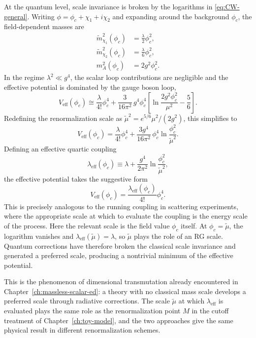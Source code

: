 At the quantum level, scale invariance is broken by the logarithms in
\eqref{eq:CW-general}. Writing $\phi = \phi_c + \chi_1 + i\chi_2$ and
expanding around the background $\phi_c$, the field-dependent masses are
\begin{align}
	\tilde m_{\chi_1}^2(\phi_c) & = \frac{\lambda}{2}\phi_c^2, \\
	\tilde m_{\chi_2}^2(\phi_c) & = \frac{\lambda}{6}\phi_c^2, \\
	m_A^2(\phi_c)               & = 2g^2\phi_c^2.
\end{align}
In the regime $\lambda^2\ll g^4$, the scalar loop contributions are
negligible and the effective potential is dominated by the gauge boson
loop,
\begin{equation}
	V_{\text{eff}}(\phi_c) \cong \frac{\lambda}{4!}\phi_c^4
	+ \frac{3}{16\pi^2}\,g^4\phi_c^4
	\left[\ln\frac{2g^2\phi_c^2}{\mu^2} - \frac{5}{6}\right].
\end{equation}
Redefining the renormalization scale as $\tilde\mu^2 =
	e^{5/6}\mu^2/(2g^2)$, this simplifies to
\begin{equation}
	V_{\text{eff}}(\phi_c) = \frac{\lambda}{4!}\phi_c^4
	+ \frac{3g^4}{16\pi^2}\,\phi_c^4
	\ln\frac{\phi_c^2}{\tilde\mu^2}.
\end{equation}
Defining an effective quartic coupling
\begin{equation}
	\lambda_{\text{eff}}(\phi_c) \equiv \lambda
	+ \frac{g^4}{2\pi^2}\ln\frac{\phi_c^2}{\tilde\mu^2},
\end{equation}
the effective potential takes the suggestive form
\begin{equation}
	V_{\text{eff}}(\phi_c) = \frac{\lambda_{\text{eff}}(\phi_c)}{4!}
	\phi_c^4.
\end{equation}
This is precisely analogous to the running coupling in scattering
experiments, where the appropriate scale at which to evaluate the
coupling is the energy scale of the process. Here the relevant scale is
the field value $\phi_c$ itself. At $\phi_c = \tilde\mu$, the logarithm
vanishes and $\lambda_{\text{eff}}(\tilde\mu) = \lambda$, so $\tilde\mu$
plays the role of an RG scale. Quantum corrections have therefore broken
the classical scale invariance and generated a preferred scale, producing
a nontrivial minimum of the effective potential.


This is the phenomenon of dimensional transmutation already encountered
in Chapter~\ref{ch:massless-scalar-ed}: a theory with no classical mass
scale develops a preferred scale through radiative corrections. The scale
$\tilde\mu$ at which $\lambda_{\text{eff}}$ is evaluated plays the same
role as the renormalization point $M$ in the cutoff treatment of
Chapter~\ref{ch:toy-model}, and the two approaches give the same
physical result in different renormalization schemes.

